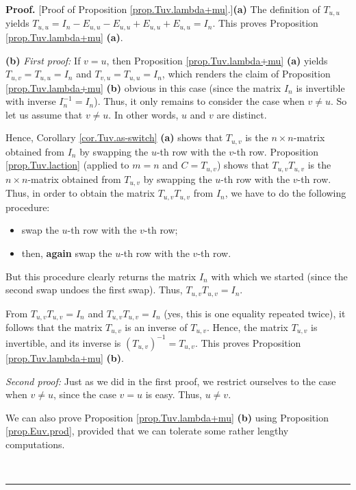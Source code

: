 \documentclass[numbers=enddot,12pt,final,onecolumn,notitlepage]{scrartcl}%
\theoremstyle{definition}
\newenvironment{proof}[1][Proof]{\noindent\textbf{#1.} }{\ \rule{0.5em}{0.5em}}
\begin{document}
\begin{proof}
[Proof of Proposition \ref{prop.Tuv.lambda+mu}.]\textbf{(a)} The definition of
$T_{u,u}$ yields $T_{u,u}=I_{n}-E_{u,u}-E_{u,u}+E_{u,u}+E_{u,u}=I_{n}$. This
proves Proposition \ref{prop.Tuv.lambda+mu} \textbf{(a)}.

\textbf{(b)} \textit{First proof:} If $v=u$, then Proposition
\ref{prop.Tuv.lambda+mu} \textbf{(a)} yields $T_{u,v}=T_{u,u}=I_{n}$ and
$T_{v,u}=T_{u,u}=I_{n}$, which renders the claim of Proposition
\ref{prop.Tuv.lambda+mu} \textbf{(b)} obvious in this case (since the matrix
$I_{n}$ is invertible with inverse $I_{n}^{-1}=I_{n}$). Thus, it only remains
to consider the case when $v\neq u$. So let us assume that $v\neq u$. In other
words, $u$ and $v$ are distinct.

Hence, Corollary \ref{cor.Tuv.as-switch} \textbf{(a)} shows that $T_{u,v}$ is
the $n\times n$-matrix obtained from $I_{n}$ by swapping the $u$-th row with
the $v$-th row. Proposition \ref{prop.Tuv.laction} (applied to $m=n$ and
$C=T_{u,v}$) shows that $T_{u,v}T_{u,v}$ is the $n\times n$-matrix obtained
from $T_{u,v}$ by swapping the $u$-th row with the $v$-th row. Thus, in order
to obtain the matrix $T_{u,v}T_{u,v}$ from $I_{n}$, we have to do the
following procedure:

\begin{itemize}
\item swap the $u$-th row with the $v$-th row;

\item then, \textbf{again} swap the $u$-th row with the $v$-th row.
\end{itemize}

But this procedure clearly returns the matrix $I_{n}$ with which we started
(since the second swap undoes the first swap). Thus, $T_{u,v}T_{u,v}=I_{n}$.

From $T_{u,v}T_{u,v}=I_{n}$ and $T_{u,v}T_{u,v}=I_{n}$ (yes, this is one
equality repeated twice), it follows that the matrix $T_{u,v}$ is an inverse
of $T_{u,v}$. Hence, the matrix $T_{u,v}$ is invertible, and its inverse is
$\left(  T_{u,v}\right)  ^{-1}=T_{u,v}$. This proves Proposition
\ref{prop.Tuv.lambda+mu} \textbf{(b)}.

\textit{Second proof:} Just as we did in the first proof, we restrict
ourselves to the case when $v\neq u$, since the case $v=u$ is easy. Thus,
$u\neq v$.

We can also prove Proposition \ref{prop.Tuv.lambda+mu} \textbf{(b)} using
Proposition \ref{prop.Euv.prod}, provided that we can tolerate some rather
lengthy computations.


\end{proof}
\end{document}
